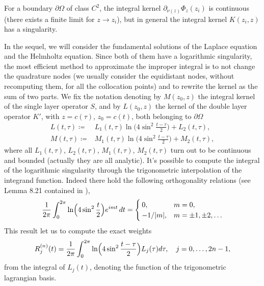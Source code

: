 \documentclass[10pt, a4paper]{article} %
\numberwithin{equation}{section}
\theoremstyle{definition}
\theoremstyle{plain}
\theoremstyle{plain}
\theoremstyle{plain}
\theoremstyle{plain}
\theoremstyle{plain}
\theoremstyle{plain}
\theoremstyle{plain}
\theoremstyle{plain}
\begin{document}
For a boundary $\partial\Omega$ of class $C^2$, the integral kernel $\partial_{\nu(z)}\Phi_{z}(z_i)$ is 
continuous (there exists a finite limit for $z\to z_i$), but in general the integral 
kernel $K(z_i,z)$ has a singularity.
\par 
In the sequel, we will consider the fundamental solutions
of the Laplace equation and the Helmholtz equation. Since both of them have a logarithmic 
singularity, the most efficient method to approximate the improper integral 
is to not change the quadrature nodes (we usually consider the equidistant nodes, 
without recomputing them, for all the collocation points)
and to rewrite the kernel as the sum of two parts. 
We fix the notation denoting by $M(z_0,z)$ the integral kernel of the single 
layer operator $S$, and by $L(z_0, z)$ the kernel of the double layer operator $K'$, 
with $z=c(\tau)$, $z_0=c(t)$, both belonging to $\partial\Omega$
\begin{align}
 L(t,\tau)
 \coloneqq
 &L_1(t,\tau)\ln\Big(4\sin^2\frac{t-\tau}{2}\Big)+L_2(t,\tau),
 \label{eq:def-kernel-L}\\
 M(t,\tau)
 \coloneqq
 &M_1(t,\tau)\ln\Big(4\sin^2\frac{t-\tau}{2}\Big)+M_2(t,\tau),
 \label{eq:def-kernel-M}
\end{align}
where all $L_1(t,\tau)$, $L_2(t,\tau)$, $M_1(t,\tau)$, $M_2(t,\tau)$ turn out
to be continuous and bounded (actually they are all analytic).
It's possible to compute the integral of the logarithmic singularity
through the trigonometric interpolation of the integrand function.
Indeed there hold the following orthogonality relations
(see Lemma 8.21 contained in \cite{kress:book}),
\begin{equation}
 \frac{1}{2\pi}\int_0^{2\pi}\ln\Bigl(4\sin^2\frac{t}{2}\Bigr)e^{imt}\,dt=
 \begin{cases}
  0, & m=0, \\
  -1/|m|, & m=\pm1,\pm2,\dots
 \end{cases}
\end{equation}
This result let us to compute the exact weights 
\begin{equation}
 R_j^{(n)}(t)=\frac{1}{2\pi}\int_0^{2\pi}\ln\Bigl(4\sin^2\frac{t-\tau}{2}\Bigr)L_j(\tau)d\tau, \quad j=0,\dots,2n-1,
\end{equation}
from the integral of $L_j(t)$, denoting the function of the trigonometric lagrangian basis.
\end{document}
